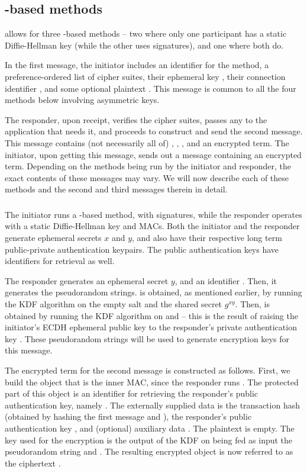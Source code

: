 \subsection{\mStat-based methods}
\mEdhoc allows for three \mStat-based methods -- two where only one participant has a static Diffie-Hellman key (while the other uses signatures), and one where both do. 

In the first message, the initiator includes an identifier for the method, a preference-ordered list of cipher suites, their ephemeral key \mGx, their connection identifier \mCi, and some optional plaintext \mADone. This message is common to all the four methods below involving asymmetric keys. 

The responder, upon receipt, verifies the cipher suites, passes any \mADone to the application that needs it, and proceeds to construct and send the second message. This message contains (not necessarily all of) \mCi, \mGy, \mCr, and an encrypted term. The initiator, upon getting this message, sends out a message containing an encrypted term. Depending on the methods being run by the initiator and responder, the exact contents of these messages may vary. We will now describe each of these methods and the second and third messages therein in detail.

\subsubsection{\mSigStat}
The initiator runs a \mSigma-based method, with signatures, while the responder operates with a static Diffie-Hellman key and MACs. Both the initiator and the responder generate ephemeral secrets $x$ and $y$, and also have their respective long term public-private authentication keypairs. The public authentication keys have identifiers for retrieval as well.

The responder generates an ephemeral secret $y$, and an identifier \mCr. Then, it generates the pseudorandom strings. \mPRKtwo is obtained, as mentioned earlier, by running the KDF algorithm on the empty salt and the shared secret $g^{xy}$. Then, \mPRKthree is obtained by running the KDF algorithm on \mPRKtwo and \mGrx -- this is the result of raising the initiator's ECDH ephemeral public key \mGx to the responder's private authentication key \mLtkr. These pseudorandom strings will be used to generate encryption keys for this message.

The encrypted term for the second message is constructed as follows. First, we build the \mCose object that is the inner MAC, since the responder runs \mStat. The protected part of this object is an identifier for retrieving the responder's public authentication key, namely \mIdcredr. The externally supplied data is the transaction hash \mTHtwo (obtained by hashing the first message and \mGy),  the responder's public authentication key \mCredr, and (optional) auxiliary data \mADtwo. The plaintext is empty. The key used for the encryption \mKtwom is the output of the KDF on being fed as input the pseudorandom string \mPRKthree and \mTHtwo. The resulting encrypted object is now referred to as the ciphertext \mMactwo. 

